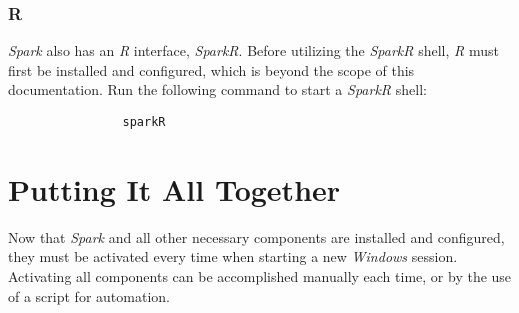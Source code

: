 \documentclass{article}
\begin{document}
            \subsubsection{R}
            \emph{Spark} also has an \emph{R} interface, \emph{SparkR}. Before utilizing the \emph{SparkR}
            shell, \emph{R} must first be installed and configured, which is beyond the scope of this
            documentation. Run the following command to start a \emph{SparkR} shell:
            \begin{verbatim}
                sparkR
            \end{verbatim}

\newpage
\section{Putting It All Together}
Now that \emph{Spark} and all other necessary components are installed and configured, they must be
activated every time when starting a new \emph{Windows} session. Activating all components can be
accomplished manually each time, or by the use of a script for automation.
\end{document}
